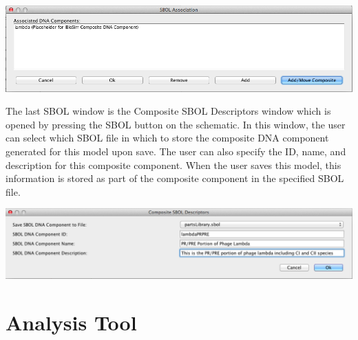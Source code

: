 \documentclass[titlepage,11pt]{article}
\begin{document}
\begin{center}
\includegraphics[width=160mm]{screenshots/AssociateSBOLModel}
\end{center}

The last SBOL window is the Composite SBOL Descriptors window which is opened by pressing the SBOL button on the schematic.  In this window, the user can select which SBOL file in which to store the composite DNA component generated for this model upon save.  The user can also specify the ID, name, and description for this composite component.  When the user saves this model, this information is stored as part of the composite component in the specified SBOL file.

\begin{center}
\includegraphics[width=160mm]{screenshots/SBOLbutton}
\end{center}

\clearpage

\section{\label{Analysis}Analysis Tool}
\end{document}
